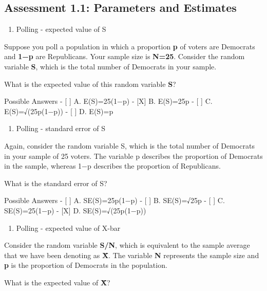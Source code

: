 \documentclass[
]{article}
\providecommand{\tightlist}{%
  \setlength{\itemsep}{0pt}\setlength{\parskip}{0pt}}
\begin{document}
\hypertarget{assessment-1.1-parameters-and-estimates}{%
\subsection{Assessment 1.1: Parameters and
Estimates}\label{assessment-1.1-parameters-and-estimates}}

\begin{enumerate}
\def\labelenumi{\arabic{enumi}.}
\tightlist
\item
  Polling - expected value of S
\end{enumerate}

Suppose you poll a population in which a proportion \textbf{p} of voters
are Democrats and \textbf{1−p} are Republicans. Your sample size is
\textbf{N=25}. Consider the random variable \textbf{S}, which is the
total number of Democrats in your sample.

What is the expected value of this random variable \textbf{S}?

Possible Answers - {[} {]} A. E(S)=25(1−p) - {[}X{]} B. E(S)=25p - {[}
{]} C. E(S)=√(25p(1−p)) - {[} {]} D. E(S)=p

\begin{enumerate}
\def\labelenumi{\arabic{enumi}.}
\setcounter{enumi}{1}
\tightlist
\item
  Polling - standard error of S
\end{enumerate}

Again, consider the random variable S, which is the total number of
Democrats in your sample of 25 voters. The variable p describes the
proportion of Democrats in the sample, whereas 1−p describes the
proportion of Republicans.

What is the standard error of S?

Possible Answers - {[} {]} A. SE(S)=25p(1−p) - {[} {]} B. SE(S)=√25p -
{[} {]} C. SE(S)=25(1−p) - {[}X{]} D. SE(S)=√(25p(1−p))

\begin{enumerate}
\def\labelenumi{\arabic{enumi}.}
\setcounter{enumi}{2}
\tightlist
\item
  Polling - expected value of X-bar
\end{enumerate}

Consider the random variable \textbf{S/N}, which is equivalent to the
sample average that we have been denoting as \textbf{X̄}. The variable
\textbf{N} represents the sample size and \textbf{p} is the proportion
of Democrats in the population.

What is the expected value of \textbf{X̄}?
\end{document}
